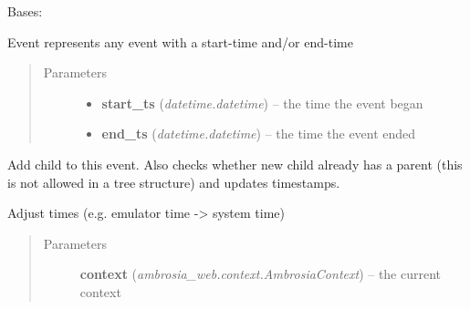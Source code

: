 \documentclass[letterpaper,10pt,english]{sphinxmanual}
\begin{document}

\begin{fulllineitems}
\label{ambrosia.model:ambrosia.model.Event}
Bases: 

Event represents any event with a start-time and/or end-time
\begin{quote}\begin{description}
\item[{Parameters}] \leavevmode\begin{itemize}
\item {} 
\textbf{start\_ts} (\emph{datetime.datetime}) -- the time the event began

\item {} 
\textbf{end\_ts} (\emph{datetime.datetime}) -- the time the event ended

\end{itemize}

\end{description}\end{quote}

\begin{fulllineitems}
\label{ambrosia.model:ambrosia.model.Event.add_child}
Add child to this event. Also checks whether new child already has a parent (this is not allowed in a tree
structure) and updates timestamps.

\end{fulllineitems}


\begin{fulllineitems}
\label{ambrosia.model:ambrosia.model.Event.adjust_times}
Adjust times (e.g. emulator time -\textgreater{} system time)
\begin{quote}\begin{description}
\item[{Parameters}] \leavevmode
\textbf{context} (\emph{ambrosia\_web.context.AmbrosiaContext}) -- the current context

\end{description}\end{quote}


\end{fulllineitems}
\end{fulllineitems}
\end{document}
